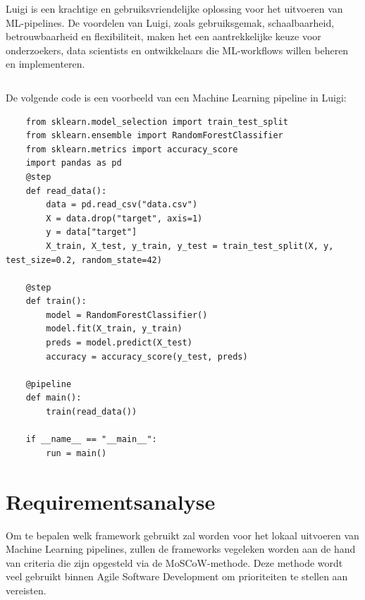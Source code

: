 Luigi is een krachtige en gebruiksvriendelijke oplossing voor het uitvoeren van ML-pipelines. De voordelen van Luigi, zoals gebruiksgemak, schaalbaarheid, betrouwbaarheid en flexibiliteit, maken het een aantrekkelijke keuze voor onderzoekers, data scientists en ontwikkelaars die ML-workflows willen beheren en implementeren.
\begin{verbatim}
\end{verbatim}
De volgende code is een voorbeeld van een Machine Learning pipeline in Luigi:

\begin{verbatim}
    from sklearn.model_selection import train_test_split
    from sklearn.ensemble import RandomForestClassifier
    from sklearn.metrics import accuracy_score
    import pandas as pd
    @step
    def read_data():
        data = pd.read_csv("data.csv")
        X = data.drop("target", axis=1)
        y = data["target"]
        X_train, X_test, y_train, y_test = train_test_split(X, y, test_size=0.2, random_state=42)

    @step    
    def train():
        model = RandomForestClassifier()
        model.fit(X_train, y_train)
        preds = model.predict(X_test)
        accuracy = accuracy_score(y_test, preds)
    
    @pipeline
    def main():
        train(read_data())

    if __name__ == "__main__":
        run = main()
\end{verbatim}
\section{Requirementsanalyse}
Om te bepalen welk framework gebruikt zal worden voor het lokaal uitvoeren van Machine Learning pipelines, zullen de frameworks vegeleken worden aan de hand van criteria die zijn opgesteld via de MoSCoW-methode. Deze methode wordt veel gebruikt binnen Agile Software Development om prioriteiten te stellen aan vereisten.

